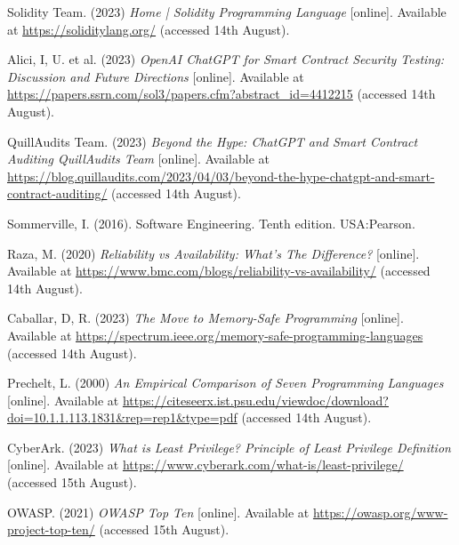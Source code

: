  \noindent [25] Solidity Team. (2023) \textit{Home | Solidity Programming Language} [online]. Available at \url{https://soliditylang.org/} (accessed 14th August).
 \vspace{0.2cm}

 \noindent [26] Alici, I, U. et al. (2023) \textit{OpenAI ChatGPT for Smart Contract Security Testing: Discussion and Future Directions} [online]. Available at \url{https://papers.ssrn.com/sol3/papers.cfm?abstract_id=4412215} (accessed 14th August).
 \vspace{0.2cm}

 \noindent [27] QuillAudits Team. (2023) \textit{Beyond the Hype: ChatGPT and Smart Contract Auditing QuillAudits Team} [online]. Available at \url{https://blog.quillaudits.com/2023/04/03/beyond-the-hype-chatgpt-and-smart-contract-auditing/} (accessed 14th August).
 \vspace{0.2cm}

 \noindent [28] Sommerville, I. (2016). Software Engineering. Tenth edition. USA:Pearson.
 \vspace{0.2cm}
 
 \noindent [29] Raza, M. (2020) \textit{Reliability vs Availability: What's The Difference?} [online]. Available at \url{https://www.bmc.com/blogs/reliability-vs-availability/} (accessed 14th August).
 \vspace{0.2cm}

 \noindent [30] Caballar, D, R. (2023) \textit{The Move to Memory-Safe Programming} [online]. Available at \url{https://spectrum.ieee.org/memory-safe-programming-languages} (accessed 14th August).
 \vspace{0.2cm}

 \noindent [31] Prechelt, L. (2000) \textit{An Empirical Comparison of Seven Programming Languages} [online]. Available at \url{https://citeseerx.ist.psu.edu/viewdoc/download?doi=10.1.1.113.1831&rep=rep1&type=pdf} (accessed 14th August).
 \vspace{0.2cm}

 \noindent [32] CyberArk. (2023) \textit{What is Least Privilege? Principle of Least Privilege Definition} [online]. Available at \url{https://www.cyberark.com/what-is/least-privilege/} (accessed 15th August).
 \vspace{0.2cm}

 \noindent [33] OWASP. (2021) \textit{OWASP Top Ten} [online]. Available at \url{https://owasp.org/www-project-top-ten/} (accessed 15th August).
 \vspace{0.2cm}

